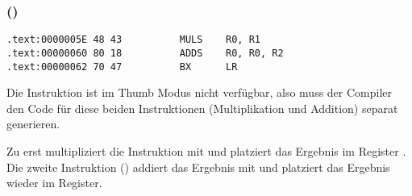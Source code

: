 \subsubsection{\OptimizingKeilVI (\ThumbMode)}

\begin{lstlisting}[label=ARM_leaf_example2,style=customasmARM]
.text:0000005E 48 43          MULS    R0, R1
.text:00000060 80 18          ADDS    R0, R0, R2
.text:00000062 70 47          BX      LR
\end{lstlisting}

Die  Instruktion ist im Thumb Modus nicht verfügbar, also muss der Compiler den Code für diese
beiden Instruktionen (Multiplikation und Addition) separat generieren. 


Zu erst multipliziert die  Instruktion  mit  und platziert das Ergebnis im Register .
Die zweite Instruktion () addiert das Ergebnis mit  und platziert das Ergebnis wieder im  Register.


